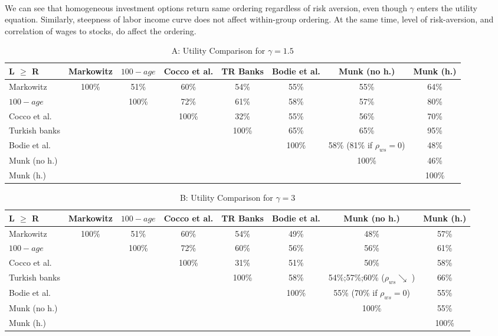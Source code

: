 \paragraph{}We can see that homogeneous investment options return same ordering regardless of risk aversion, even though $\gamma$ enters the utility equation. Similarly, steepness of labor income curve does not affect within-group ordering. At the same time, level of risk-aversion, and correlation of wages to stocks, do affect the ordering.


\begin{table}[h!]
	\centering
	\caption{A: Utility Comparison for $\gamma=1.5$}
	\label{table:compareutils}
	\begin{tabular}[c]{|l|ccccccc|}
		\hline
		L $\geq$ R			&Markowitz&$100-age$&Cocco et al.&TR Banks&Bodie et al.&Munk (no h.)&Munk (h.)\\
		\hline
Markowitz					&100\%&51\%&60\%&54\%&55\%&55\%&64\%\\
$100-age$					&&100\%&72\%&61\%&58\%&57\%&80\%\\
Cocco et al.				&&&100\%&32\%&55\%&56\%&70\%\\
Turkish banks			 	&&&&100\%&65\%&65\%&95\%\\
Bodie et al.			 	&&&&&100\%&58\% (81\% if $\rho_{ws}=0$)&48\%\\
Munk (no h.)				&&&&&&100\%&46\%\\
Munk (h.)					&&&&&&&100\%\\
	\hline
	\end{tabular}
\end{table}
\begin{table}[h!]\ContinuedFloat
	\centering
	\caption{B: Utility Comparison for $\gamma=3$}
	\label{table:compareutils}
	\begin{tabular}[c]{|l|ccccccc|}
		\hline
		L $\geq$ R			&Markowitz&$100-age$&Cocco et al.&TR Banks&Bodie et al.&Munk (no h.)&Munk (h.)\\
		\hline
Markowitz					&100\%&51\%&60\%&54\%&49\%&48\%&57\%\\
$100-age$					&&100\%&72\%&60\%&56\%&56\%&61\%\\
Cocco et al.				&&&100\%&31\%&51\%&50\%&58\%\\
Turkish banks			 	&&&&100\%&58\%&54\%;57\%;60\% ($\rho_{ws} \searrow$ )&66\%\\
Bodie et al.			 	&&&&&100\%&55\% (70\% if $\rho_{ws}=0$)&55\%\\
Munk (no h.)				&&&&&&100\%&55\%\\
Munk (h.)					&&&&&&&100\%\\
	\hline
	\end{tabular}
\end{table}
